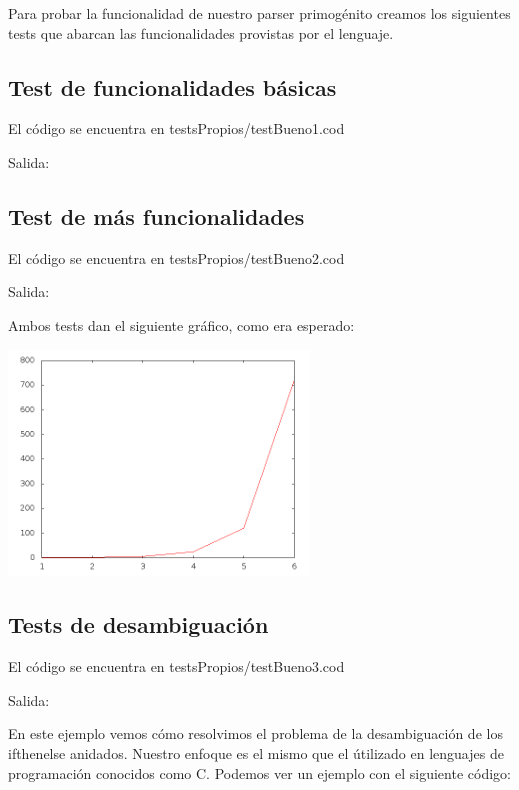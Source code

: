Para probar la funcionalidad de nuestro parser primogénito creamos los siguientes tests que abarcan las funcionalidades provistas por el lenguaje.

\subsection{Test de funcionalidades básicas}
	El código se encuentra en testsPropios/testBueno1.cod
	
	Salida:
	
\subsection{Test de más funcionalidades}
	El código se encuentra en testsPropios/testBueno2.cod
	
	Salida:
	
	
Ambos tests dan el siguiente gráfico, como era esperado:

\includegraphics[width=0.60\textwidth,height=0.60\textheight,keepaspectratio]{testsPropios/graficoTest1.png}
\subsection{Tests de desambiguación}
	El código se encuentra en testsPropios/testBueno3.cod
	
	Salida:
	
	
	
	
	En este ejemplo vemos cómo resolvimos el problema de la desambiguación de los ifthenelse anidados. Nuestro enfoque es el mismo que el útilizado en lenguajes de programación conocidos como C. Podemos ver un ejemplo con el siguiente código:
		
	